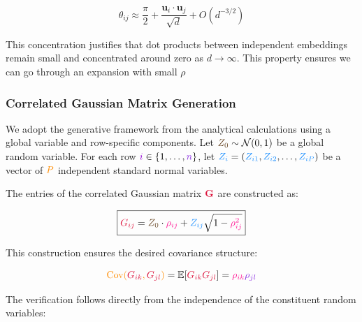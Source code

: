 \documentclass[a4paper]{article}
\theoremstyle{plain}
\theoremstyle{definition}
\theoremstyle{remark}
\begin{document}
\begin{equation}
\boxed{\theta_{ij} \approx \frac{\pi}{2} + \frac{\mathbf{u}_i \cdot \mathbf{u}_j}{\sqrt{d}} + O(d^{-3/2})} \label{eq:angular_concentration}
\end{equation}

This concentration justifies that dot products between independent embeddings remain small and concentrated around zero as $d \to \infty$. This property ensures we can go through an expansion with small $\rho$



\subsubsection{Correlated Gaussian Matrix Generation}

We adopt the generative framework from the analytical calculations using a \textcolor{kernelcolor}{global variable} and \textcolor{sobolevcolor}{row-specific components}. Let $\textcolor{weightcolor}{Z_0} \sim \mathcal{N}(0,1)$ be a \textcolor{kernelcolor}{global random variable}. For each row $\textcolor{k3color}{i} \in \{1, \ldots, \textcolor{methodcolor}{n}\}$, let $\textcolor{sobolevcolor}{Z_i} = (\textcolor{sobolevcolor}{Z_{i1}}, \textcolor{sobolevcolor}{Z_{i2}}, \ldots, \textcolor{sobolevcolor}{Z_{iP}})$ be a vector of $\textcolor{insightcolor}{P}$ independent standard normal variables.

The entries of the correlated Gaussian matrix $\textcolor{kernelcolor}{\mathbf{G}}$ are constructed as:

\begin{equation}
\boxed{\textcolor{kernelcolor}{G_{ij}} = \textcolor{weightcolor}{Z_0} \cdot \textcolor{breakthroughcolor}{\rho_{ij}} + \textcolor{sobolevcolor}{Z_{ij}} \sqrt{1 - \textcolor{breakthroughcolor}{\rho_{ij}^2}}} \label{eq:generative_construction}
\end{equation}

This construction ensures the desired \textcolor{resultcolor}{covariance structure}:

\begin{equation}
\textcolor{insightcolor}{\text{Cov}(\textcolor{kernelcolor}{G_{ik}}, \textcolor{kernelcolor}{G_{jl}})} = \mathbb{E}[\textcolor{kernelcolor}{G_{ik}} \textcolor{kernelcolor}{G_{jl}}] = \textcolor{breakthroughcolor}{\rho_{ik}} \textcolor{methodcolor}{\rho_{jl}} \label{eq:separable_covariance}
\end{equation}

The verification follows directly from the independence of the constituent random variables:
\end{document}
